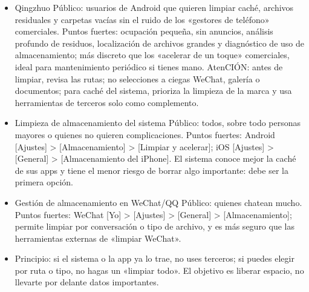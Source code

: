 \begin{itemize}
  \item Qingzhuo Público: usuarios de Android que quieren limpiar caché, archivos residuales y carpetas vacías sin el ruido de los «gestores de teléfono» comerciales. Puntos fuertes: ocupación pequeña, sin anuncios, análisis profundo de residuos, localización de archivos grandes y diagnóstico de uso de almacenamiento; más discreto que los «acelerar de un toque» comerciales, ideal para mantenimiento periódico si tienes mano. AtenCIÓN: antes de limpiar, revisa las rutas; no selecciones a ciegas WeChat, galería o documentos; para caché del sistema, prioriza la limpieza de la marca y usa herramientas de terceros solo como complemento.
  \item Limpieza de almacenamiento del sistema Público: todos, sobre todo personas mayores o quienes no quieren complicaciones. Puntos fuertes: Android [Ajustes] > [Almacenamiento] > [Limpiar y acelerar]; iOS [Ajustes] > [General] > [Almacenamiento del iPhone]. El sistema conoce mejor la caché de sus apps y tiene el menor riesgo de borrar algo importante: debe ser la primera opción.
  \item Gestión de almacenamiento en WeChat/QQ Público: quienes chatean mucho. Puntos fuertes: WeChat [Yo] > [Ajustes] > [General] > [Almacenamiento]; permite limpiar por conversación o tipo de archivo, y es más seguro que las herramientas externas de «limpiar WeChat».
  \item Principio: si el sistema o la app ya lo trae, no uses terceros; si puedes elegir por ruta o tipo, no hagas un «limpiar todo». El objetivo es liberar espacio, no llevarte por delante datos importantes.
\end{itemize}


